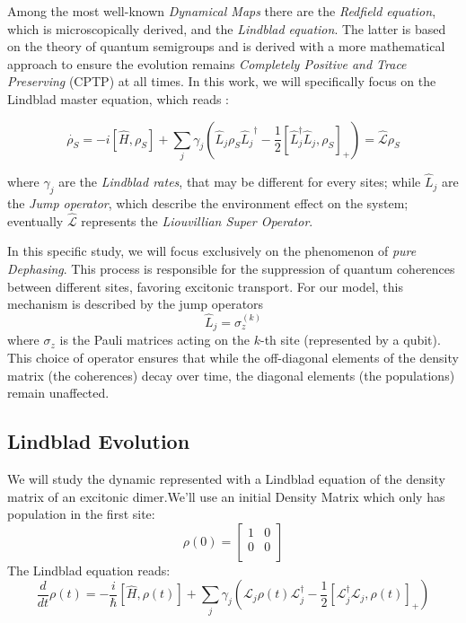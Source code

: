\documentclass[a4paper,12pt]{article}
\begin{document}
	Among the most well-known \textit{Dynamical Maps} there are the \textit{Redfield equation}, which is microscopically derived, and the \textit{Lindblad equation}. The latter is based on the theory of quantum semigroups and is derived with a more mathematical approach to ensure the evolution remains \textit{Completely Positive and Trace Preserving} (CPTP) at all times. In this work, we will specifically focus on the Lindblad master equation, which reads :

	\begin{equation}
		\dot{\rho_{S}} = -i [\hat{H}, \rho_{S}] + \sum_j \gamma_j \left( \hat{L}_j \rho_{S} {\hat{L}_j}^\dagger - \frac{1}{2} \left[ \hat{L}_j^\dagger \hat{L}_j, \rho_{S} \right]_{+} \right) = \hat{\mathcal{L}} \rho_{S}
		\label{eq:lindblad}
	\end{equation}

	where $ \gamma_j $ are the \textit{Lindblad rates}, that may be different for every sites; while $ \hat{L}_j $ are the \textit{Jump operator}, which describe the environment effect on the system; eventually $ \hat{\mathcal{L}} $ represents the \textit{Liouvillian Super Operator}.

	In this specific study, we will focus exclusively on the phenomenon of \textit{pure Dephasing}. This process is responsible for the suppression of quantum coherences between different sites, favoring excitonic transport.
	For our model, this mechanism is described by the jump operators
	\begin{equation}
		\hat{L}_j = \sigma_z^{(k)}
		\label{eq:jump_operator_z}
	\end{equation}
	where $\sigma_z$ is the Pauli matrices acting on the $k$-th site (represented by a qubit). This choice of operator ensures that while the off-diagonal elements of the density matrix (the coherences) decay over time, the diagonal elements (the populations) remain unaffected.

	\subsection{Lindblad Evolution}
	\label{sub:lindblad_evo}
	We will study the dynamic represented with a Lindblad equation of the density matrix of an excitonic dimer.We'll use an initial Density Matrix which only has population in the first site:
	\begin{equation}
		\rho (0)  = \begin{bmatrix}1 & 0 \\ 0 & 0 \\\end{bmatrix}
	\end{equation}
	The Lindblad equation reads:
	\begin{equation}
		\frac{d}{dt} \rho (t) = 	-\frac{i}{\hbar} \left[ \hat{H}, \rho (t) \right] + \sum_{j}{\gamma_j \left( \mathcal{L}_j \rho (t) \mathcal{L}_j^\dagger - \frac{1}{2} \left[ \mathcal{L}_j^\dagger \mathcal{L}_j, \rho (t) \right]_+ \right) }
	\end{equation}
\end{document}
